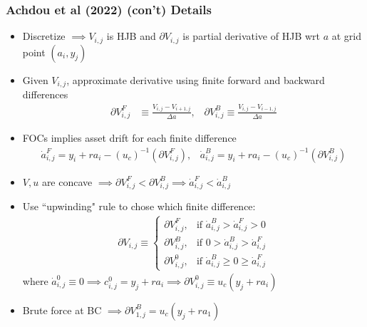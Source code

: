 \documentclass[usenames,dvipsnames, handout, aspectratio=169]{beamer}
\begin{document}
\begin{frame}[label = achdou_details_2]
\frametitle{Achdou et al (2022) (con't) Details}
\small
\begin{itemize}
\item Discretize $\implies V_{i,j}$ is HJB and $\partial V_{i,j}$ is partial derivative of HJB wrt $a$ at grid point $(a_i, y_j)$
\item Given $V_{i,j}$, approximate derivative using finite forward and backward differences
\begin{align*}
\partial V_{i,j}^F &\equiv \frac{V_{i,j} - V_{i+1,j}}{\Delta a},  \;\;\;
\partial V_{i,j}^B \equiv \frac{V_{i,j} - V_{i-1,j}}{\Delta a}
\end{align*}
\item FOCs implies asset drift for each finite difference
\begin{align*}
\dot a_{i,j}^F = y_i + ra_i - (u_c)^{-1}(\partial V_{i,j}^F),  \;\;\;
\dot a_{i,j}^B = y_i + ra_i - (u_c)^{-1}(\partial V_{i,j}^B)
\end{align*}
\item $V,u$ are concave $\implies \partial V_{i,j}^F < \partial V_{i,j}^B \implies \dot a_{i,j}^F < \dot a_{i,j}^B$
\item Use ``upwinding" rule to chose which finite difference:
\begin{align*}
\partial V_{i,j} \equiv 
\begin{cases} 
\partial V_{i,j}^F,  &\text{if } \dot a^B_{i,j} > \dot a^F_{i,j} > 0\\
\partial V_{i,j}^B,  &\text{if } 0 > \dot a^B_{i,j} > \dot a^F_{i,j}\\
\partial V_{i,j}^0,  &\text{if } \dot a^B_{i,j} \ge 0 \ge \dot a^F_{i,j}
\end{cases}
\end{align*}
where $\dot a_{i,j}^0 \equiv 0 \implies c_{i,j}^0 = y_j + ra_i \implies \partial V_{i,j}^0 \equiv u_c(y_j + r a_i)$
\item Brute force at BC $\implies \partial V_{1,j}^B = u_c(y_j + r a_1)$
\end{itemize}
\hyperlink{achdou_summary}{}
\end{frame}
\end{document}
